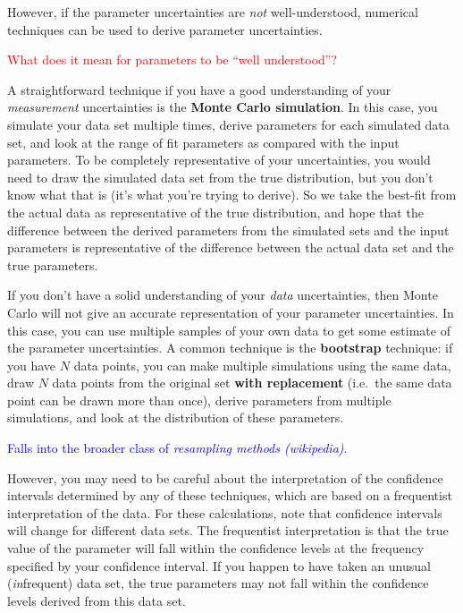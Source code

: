 \documentclass{article}
\begin{document}
However, if the parameter uncertainties are \emph{not} well-understood,
numerical techniques can be used to derive parameter uncertainties.

\textcolor{red}{What does it mean for parameters to be ``well understood''?}

A straightforward technique if you have a good understanding of your
\emph{measurement} uncertainties is the \textbf{Monte Carlo simulation}. In this
case, you simulate your data set multiple times, derive parameters for each
simulated data set, and look at the range of fit parameters as compared with
the input parameters.  To be completely representative of your uncertainties,
you would need to draw the simulated data set from the true distribution, but
you don't know what that is (it's what you're trying to derive).  So we take
the best-fit from the actual data as representative of the true distribution,
and hope that the difference between the derived parameters from the
simulated sets and the input parameters is representative of the difference
between the actual data set and the true parameters.

If you don't have a solid understanding of your \emph{data} uncertainties, then
Monte Carlo will not give an accurate representation of your parameter
uncertainties. In this case, you can use multiple samples of your own data to
get some estimate of the parameter uncertainties. A common technique is the
\textbf{bootstrap} technique: if you have $N$ data points, you can make
multiple simulations using the same data, draw $N$ data points from the
original set \textbf{with replacement} (i.e.\ the same data point can be drawn
more than once), derive parameters from multiple simulations, and look at the
distribution of these parameters.

\textcolor{blue}{Falls into the broader class of \textit{resampling methods
(wikipedia)}.
}

However, you may need to be careful about the interpretation of the confidence
intervals determined by any of these techniques, which are based on a
frequentist interpretation of the data. For these calculations, note that
confidence intervals will change for different data sets. The frequentist
interpretation is that the true value of the parameter will fall within the
confidence levels at the frequency specified by your confidence interval. If
you happen to have taken an unusual (\emph{in}frequent) data set, the true
parameters may not fall within the confidence levels derived from
this data set.
\end{document}
